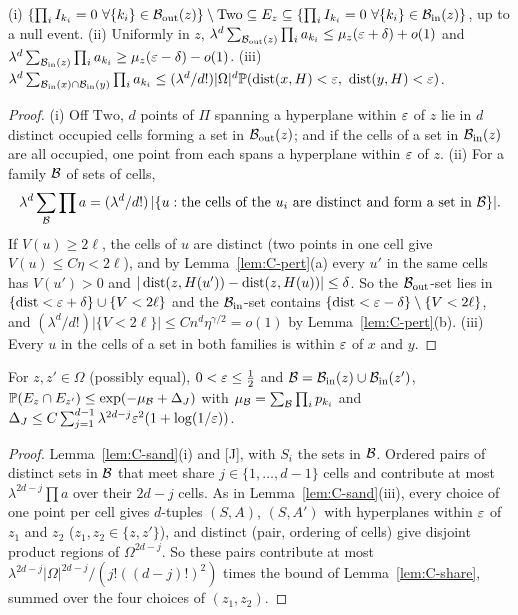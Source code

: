 \begin{lemma}[Sandwich]\label{lem:C-sand}
(i) $\{\prod_iI_{k_i} = 0\ \forall\{k_i\} \in \mathcal{B}_{\mathrm{out}}(z)\} \setminus \mathrm{Two} \subseteq E_z \subseteq \{\prod_iI_{k_i} = 0\ \forall\{k_i\} \in \mathcal{B}_{\mathrm{in}}(z)\}$, up to a
null event. (ii) Uniformly in $z$, $\lambda^d\sum_{\mathcal{B}_{\mathrm{out}}(z)}\prod_ia_{k_i} \le \mu_z(\varepsilon + \delta) + o(1)$ and
$\lambda^d\sum_{\mathcal{B}_{\mathrm{in}}(z)}\prod_ia_{k_i} \ge \mu_z(\varepsilon - \delta) - o(1)$. (iii) $\lambda^d\sum_{\mathcal{B}_{\mathrm{in}}(x) \cap \mathcal{B}_{\mathrm{in}}(y)}\prod_ia_{k_i} \le
(\lambda^d/d!)|\Omega|^d\mathbb{P}(\operatorname{dist}(x, H) < \varepsilon,\ \operatorname{dist}(y, H) < \varepsilon)$.
\end{lemma}

\begin{proof}
(i) Off $\mathrm{Two}$, $d$ points of $\Pi$ spanning a hyperplane within $\varepsilon$ of $z$ lie in $d$ distinct occupied cells forming
a set in $\mathcal{B}_{\mathrm{out}}(z)$; and if the cells of a set in $\mathcal{B}_{\mathrm{in}}(z)$ are all occupied, one point from each spans a hyperplane
within $\varepsilon$ of $z$. (ii) For a family $\mathcal{B}$ of sets of cells,
\[
  \lambda^d\sum_{\mathcal{B}}\prod a = (\lambda^d/d!)\,|\{u : \text{the cells of the }u_i\text{ are distinct and form a set in }\mathcal{B}\}|.
\]
If $V(u) \ge 2\ell$, the cells of $u$ are distinct (two points in one cell give $V(u) \le C\eta < 2\ell$), and by
Lemma~\ref{lem:C-pert}(a) every $u'$ in the same cells has $V(u') > 0$ and $|\operatorname{dist}(z, H(u')) - \operatorname{dist}(z, H(u))| \le \delta$. So
the $\mathcal{B}_{\mathrm{out}}$-set lies in $\{\operatorname{dist} < \varepsilon + \delta\} \cup \{V < 2\ell\}$ and the $\mathcal{B}_{\mathrm{in}}$-set contains
$\{\operatorname{dist} < \varepsilon - \delta\} \setminus \{V < 2\ell\}$, and $(\lambda^d/d!)|\{V < 2\ell\}| \le Cn^d\eta^{\gamma/2} = o(1)$ by
Lemma~\ref{lem:C-pert}(b). (iii) Every $u$ in the cells of a set in both families is within $\varepsilon$ of $x$ and $y$.
\end{proof}

\begin{lemma}[Janson]\label{lem:C-janson}
For $z, z' \in \Omega$ (possibly equal), $0 < \varepsilon \le \frac12$ and $\mathcal{B} = \mathcal{B}_{\mathrm{in}}(z) \cup \mathcal{B}_{\mathrm{in}}(z')$,
$\mathbb{P}(E_z \cap E_{z'}) \le \exp(-\mu_{\mathcal{B}} + \Delta_J)$ with $\mu_{\mathcal{B}} = \sum_{\mathcal{B}}\prod_ip_{k_i}$ and
$\Delta_J \le C\sum_{j=1}^{d-1}\lambda^{2d-j}\varepsilon^2(1 + \log(1/\varepsilon))$.
\end{lemma}

\begin{proof}
Lemma~\ref{lem:C-sand}(i) and [J], with $S_i$ the sets in $\mathcal{B}$. Ordered pairs of distinct sets in $\mathcal{B}$ that meet share
$j \in \{1, \dots, d - 1\}$ cells and contribute at most $\lambda^{2d-j}\prod a$ over their $2d - j$ cells. As in
Lemma~\ref{lem:C-sand}(iii), every choice of one point per cell gives $d$-tuples $(S, A)$, $(S, A')$ with hyperplanes
within $\varepsilon$ of $z_1$ and $z_2$ ($z_1, z_2 \in \{z, z'\}$), and distinct (pair, ordering of cells) give disjoint product
regions of $\Omega^{2d-j}$. So these pairs contribute at most $\lambda^{2d-j}|\Omega|^{2d-j}/(j!((d-j)!)^2)$ times the bound of
Lemma~\ref{lem:C-share}, summed over the four choices of $(z_1, z_2)$.
\end{proof}

